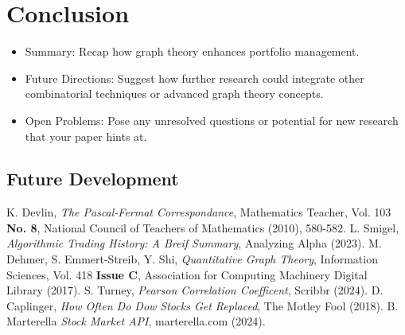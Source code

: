 \documentclass{article}
\begin{document}
\section{Conclusion}

\begin{itemize}
    \item Summary: Recap how graph theory enhances portfolio management.
    \item Future Directions: Suggest how further research could integrate other combinatorial techniques or advanced graph theory concepts.
    \item Open Problems: Pose any unresolved questions or potential for new research that your paper hints at.
\end{itemize}


\subsection{Future Development}



\begin{thebibliography}{99}
    K. Devlin, \emph{The Pascal-Fermat Correspondance}, Mathematics Teacher, Vol. 103 \textbf{No. 8}, National Council of Teachers of Mathematics (2010), 580-582.
    L. Smigel, \emph{Algorithmic Trading History: A Breif Summary}, Analyzing Alpha (2023).
    M. Dehmer, S. Emmert-Streib, Y. Shi, \emph{Quantitative Graph Theory}, Information Sciences, Vol. 418 \textbf{Issue C}, Association for Computing Machinery Digital Library (2017).
    S. Turney, \emph{Pearson Correlation Coefficent}, Scribbr (2024).
    D. Caplinger, \emph{How Often Do Dow Stocks Get Replaced}, The Motley Fool (2018).
    B. Marterella \emph{Stock Market API}, marterella.com (2024).
\end{thebibliography}
\end{document}
